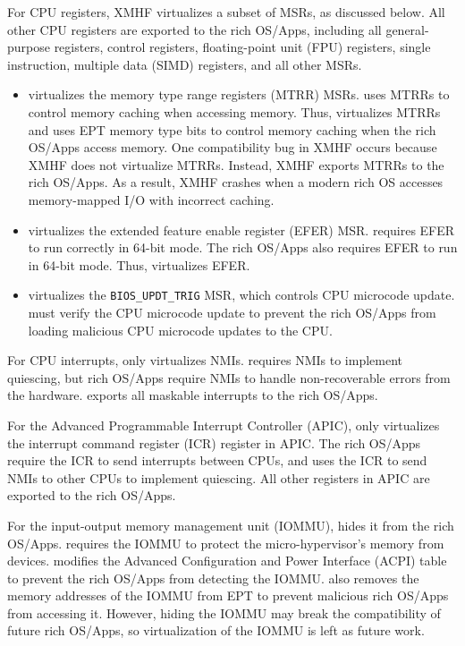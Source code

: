 For CPU registers, XMHF virtualizes a subset of MSRs, as discussed below. All other CPU registers are exported to the rich OS/Apps, including all general-purpose registers, control registers, floating-point unit (FPU) registers, single instruction, multiple data (SIMD) registers, and all other MSRs.

\begin{itemize}
\item {} virtualizes the memory type range registers (MTRR) MSRs.  uses MTRRs to control memory caching when accessing memory. Thus,  virtualizes MTRRs and uses EPT memory type bits to control memory caching when the rich OS/Apps access memory. One compatibility bug in XMHF occurs because XMHF does not virtualize MTRRs. Instead, XMHF exports MTRRs to the rich OS/Apps. As a result, XMHF crashes when a modern rich OS accesses memory-mapped I/O with incorrect caching.

\item {} virtualizes the extended feature enable register (EFER) MSR.  requires EFER to run correctly in 64-bit mode. The rich OS/Apps also requires EFER to run in 64-bit mode. Thus,  virtualizes EFER.

\item {} virtualizes the \lstinline{BIOS_UPDT_TRIG} MSR, which controls CPU microcode update.  must verify the CPU microcode update to prevent the rich OS/Apps from loading malicious CPU microcode updates to the CPU.
\end{itemize}

For CPU interrupts,  only virtualizes NMIs.  requires NMIs to implement quiescing, but rich OS/Apps require NMIs to handle non-recoverable errors from the hardware.  exports all maskable interrupts to the rich OS/Apps.

For the Advanced Programmable Interrupt Controller (APIC),  only virtualizes the interrupt command register (ICR) register in APIC. The rich OS/Apps require the ICR to send interrupts between CPUs, and  uses the ICR to send NMIs to other CPUs to implement quiescing. All other registers in APIC are exported to the rich OS/Apps.

For the input-output memory management unit (IOMMU),  hides it from the rich OS/Apps.  requires the IOMMU to protect the micro-hypervisor's memory from devices.  modifies the Advanced Configuration and Power Interface (ACPI) table to prevent the rich OS/Apps from detecting the IOMMU.  also removes the memory addresses of the IOMMU from EPT to prevent malicious rich OS/Apps from accessing it. However, hiding the IOMMU may break the compatibility of future rich OS/Apps, so virtualization of the IOMMU is left as future work.

